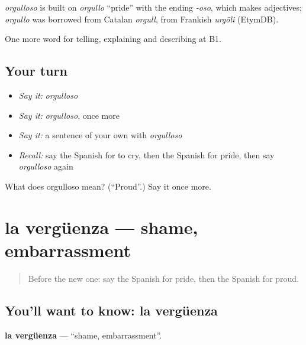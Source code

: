 \begin{cousinweb}
\emph{orgulloso} is built on \emph{orgullo} \textquotedblleft{}pride\textquotedblright{} with the ending \emph{-oso}, which makes adjectives; \emph{orgullo} was borrowed from Catalan \emph{orgull}, from Frankish \emph{urgōli} (EtymDB).
\end{cousinweb}

\begin{grammarlens}[title={What you've built}]
One more word for telling, explaining and describing at B1.
\end{grammarlens}

\subsection*{Your turn}
\begin{itemize}
\raggedright
  \item \emph{Say it:} \emph{orgulloso}
  \item \emph{Say it:} \emph{orgulloso}, once more
  \item \emph{Say it:} a sentence of your own with \emph{orgulloso}
  \item \emph{Recall:} say the Spanish for to cry, then the Spanish for pride, then say \emph{orgulloso} again
\end{itemize}

\begin{tcolorbox}[breakable,colback=teal!4,colframe=teal!35!black,title={Before you move on}]
What does orgulloso mean? (\textquotedblleft{}Proud\textquotedblright{}.) Say it once more.
\end{tcolorbox}
\section[la vergüenza]{la vergüenza — shame, embarrassment}

\label{lesson:ES-C705-verguenza}



\begin{quote}
Before the new one: say the Spanish for pride, then the Spanish for proud.
\end{quote}

\subsection*{You'll want to know: la vergüenza}
\textbf{la vergüenza} — \textquotedblleft{}shame, embarrassment\textquotedblright{}.

